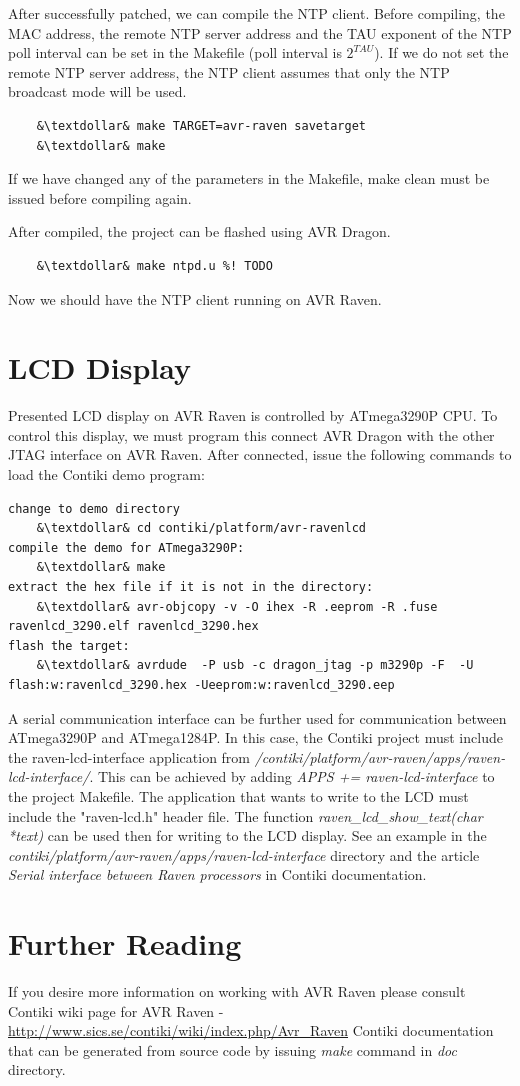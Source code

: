 \documentclass{article}
\begin{document}
After successfully patched, we can compile the NTP client.
Before compiling, the MAC address, the remote NTP server address and the TAU exponent of the NTP poll
interval can be set in the Makefile (poll interval is $2^{TAU}$).
If we do not set the remote NTP server address, the NTP client assumes that only the NTP broadcast mode
will be used.
\begin{lstlisting}
	&\textdollar& make TARGET=avr-raven savetarget
	&\textdollar& make
\end{lstlisting}
If we have changed any of the parameters in the Makefile, make clean must be issued before compiling again.

After compiled, the project can be flashed using AVR Dragon.
\begin{lstlisting}
	&\textdollar& make ntpd.u %! TODO
\end{lstlisting}
Now we should have the NTP client running on AVR Raven.

\section{LCD Display}
Presented LCD display on AVR Raven is controlled by ATmega3290P CPU.
To control this display, we must program this connect AVR Dragon with the other JTAG interface
on AVR Raven.
After connected, issue the following commands to load the Contiki demo program:
\begin{lstlisting}
change to demo directory
	&\textdollar& cd contiki/platform/avr-ravenlcd
compile the demo for ATmega3290P:
	&\textdollar& make
extract the hex file if it is not in the directory:
	&\textdollar& avr-objcopy -v -O ihex -R .eeprom -R .fuse ravenlcd_3290.elf ravenlcd_3290.hex
flash the target:
	&\textdollar& avrdude  -P usb -c dragon_jtag -p m3290p -F  -U flash:w:ravenlcd_3290.hex -Ueeprom:w:ravenlcd_3290.eep
\end{lstlisting}
A serial communication interface can be further used for communication
between ATmega3290P and ATmega1284P.
In this case, the Contiki project must include the raven-lcd-interface application from
{\it{/contiki/platform/avr-raven/apps/raven-lcd-interface/}}.
This can be achieved by adding {\it{APPS += raven-lcd-interface}} to the project Makefile.
The application that wants to write to the LCD must include the "raven-lcd.h" header file.
The function {\it{raven_lcd_show_text(char *text)}} can be used then for writing to the LCD display.
See an example in the {\it{contiki/platform/avr-raven/apps/raven-lcd-interface}} directory
and the article {\it{Serial interface between Raven processors}} in Contiki documentation.


\section{Further Reading}
If you desire more information on working with AVR Raven please consult
Contiki wiki page for AVR Raven - \url{http://www.sics.se/contiki/wiki/index.php/Avr_Raven}
Contiki documentation that can be generated from source code
by issuing {\it{make}} command in {\it{doc}} directory.
\end{document}
